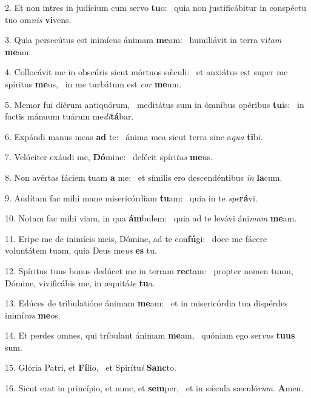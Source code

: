 2. Et non intres in judícium cum servo \textbf{tu}o: \ast\  quia non justificábitur in conspéctu tuo om\textit{nis} \textbf{vi}vens.\

3. Quia persecútus est inimícus ánimam \textbf{me}am: \ast\  humiliávit in terra vi\textit{tam} \textbf{me}am.\

4. Collocávit me in obscúris sicut mórtuos sǽculi: \dag\  et anxiátus est super me spíritus \textbf{me}us, \ast\  in me turbátum est \textit{cor} \textbf{me}um.\

5. Memor fui diérum antiquórum, \dag\  meditátus sum in ómnibus opéribus \textbf{tu}is: \ast\  in factis mánuum tuárum me\textit{di}\textbf{tá}bar.\

6. Expándi manus meas \textbf{ad} te: \ast\  ánima mea sicut terra sine a\textit{qua} \textbf{ti}bi.\

7. Velóciter exáudi me, \textbf{Dó}mine: \ast\  defécit spíri\textit{tus} \textbf{me}us.\

8. Non avértas fáciem tuam \textbf{a} me: \ast\  et símilis ero descendéntibus \textit{in} \textbf{la}cum.\

9. Audítam fac mihi mane misericórdiam \textbf{tu}am: \ast\  quia in te \textit{spe}\textbf{rá}vi.\

10. Notam fac mihi viam, in qua \textbf{ám}bulem: \ast\  quia ad te levávi áni\textit{mam} \textbf{me}am.\

11. Eripe me de inimícis meis, Dómine, ad te con\textbf{fú}gi: \ast\  doce me fácere voluntátem tuam, quia Deus me\textit{us} \textbf{es} tu.\

12. Spíritus tuus bonus dedúcet me in terram \textbf{rec}tam: \ast\  propter nomen tuum, Dómine, vivificábis me, in æquitá\textit{te} \textbf{tu}a.\

13. Edúces de tribulatióne ánimam \textbf{me}am: \ast\  et in misericórdia tua dispérdes inimí\textit{cos} \textbf{me}os.\

14. Et perdes omnes, qui tríbulant ánimam \textbf{me}am, \ast\  quóniam ego ser\textit{vus} \textbf{tu}\textbf{us} sum.\

15. Glória Patri, et \textbf{Fí}lio, \ast\  et Spirítu\textit{i} \textbf{Sanc}to.\

16. Sicut erat in princípio, et nunc, et \textbf{sem}per, \ast\  et in sǽcula sæculó\textit{rum}. \textbf{A}men.\

